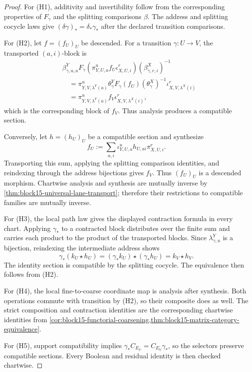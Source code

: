 \begin{proof}
For (H1), additivity and invertibility follow from the corresponding
properties of \(F_\gamma\) and the splitting comparisons \(\beta\).  The
address and splitting cocycle laws give
\((\delta\gamma)_*=\delta_*\gamma_*\) after the declared transition
comparisons.

For (H2), let \(f=(f_U)_U\) be descended.  For a transition
\(\gamma:U\to V\), the transported \((a,i)\)-block is
\[
 \begin{aligned}
 &\beta^Y_{\gamma,u,a}
 F_\gamma\!\left(
 \pi^u_{Y,U,a}f_U\iota^r_{X,U,i}
 \right)
 \left(\beta^X_{\gamma,r,i}\right)^{-1}\\
 &\quad=
 \pi^u_{Y,V,\lambda^Y(a)}
 \theta^Y_\gamma F_\gamma(f_U)(\theta^X_\gamma)^{-1}
 \iota^r_{X,V,\lambda^X(i)}\\
 &\quad=
 \pi^u_{Y,V,\lambda^Y(a)}
 f_V
 \iota^r_{X,V,\lambda^X(i)},
 \end{aligned}
\]
which is the corresponding block of \(f_V\).  Thus analysis produces a
compatible section.

Conversely, let \(h=(h_U)_U\) be a compatible section and synthesize
\[
 f_U:=\sum_{a,i}\iota^u_{Y,U,a}h_{U,ai}\pi^r_{X,U,i}.
\]
Transporting this sum, applying the splitting comparison identities, and
reindexing through the address bijections gives \(f_V\).  Thus \((f_U)_U\) is
a descended morphism.  Chartwise analysis and synthesis are mutually inverse
by \cref{thm:block15-universal-lane-transport}; therefore their restrictions
to compatible families are mutually inverse.

For (H3), the local path law gives the displayed contraction formula in every
chart.  Applying \(\gamma_*\) to a contracted block distributes over the finite
sum and carries each product to the product of the transported blocks.  Since
\(\lambda^Y_{\gamma,u}\) is a bijection, reindexing the intermediate address
shows
\[
 \gamma_*(k_U\star h_U)
 =
 (\gamma_*k_U)\star(\gamma_*h_U)
 =
 k_V\star h_V.
\]
The identity section is compatible by the splitting cocycle.  The equivalence
then follows from (H2).

For (H4), the local fine-to-coarse coordinate map is analysis after synthesis.
Both operations commute with transition by (H2), so their composite does as
well.  The strict composition and contraction identities are the corresponding
chartwise identities from
\cref{cor:block15-functorial-coarsening,thm:block15-matrix-category-equivalence}.

For (H5), support compatibility implies
\(\gamma_*C_{E_U}=C_{E_V}\gamma_*\), so the selectors preserve compatible
sections.  Every Boolean and residual identity is then checked chartwise.
\end{proof}


